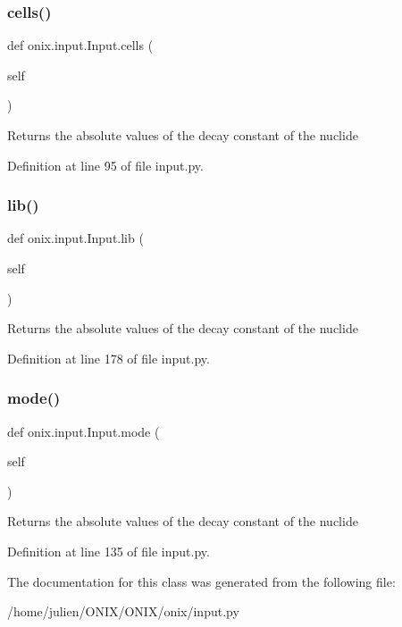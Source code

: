 \subsubsection{\texorpdfstring{cells()}{cells()}}
{\footnotesize\ttfamily def onix.\+input.\+Input.\+cells (\begin{DoxyParamCaption}\item[{}]{self }\end{DoxyParamCaption})}

\begin{DoxyVerb}Returns the absolute values of the decay constant of the nuclide\end{DoxyVerb}
 

Definition at line 95 of file input.\+py.

\mbox{\label{classonix_1_1input_1_1Input_aa9d1933ce8f2ec096ea158005527ad5b}} 
\subsubsection{\texorpdfstring{lib()}{lib()}}
{\footnotesize\ttfamily def onix.\+input.\+Input.\+lib (\begin{DoxyParamCaption}\item[{}]{self }\end{DoxyParamCaption})}

\begin{DoxyVerb}Returns the absolute values of the decay constant of the nuclide\end{DoxyVerb}
 

Definition at line 178 of file input.\+py.

\mbox{\label{classonix_1_1input_1_1Input_a6060c4ee684525bc73d4fbc15287f96a}} 
\subsubsection{\texorpdfstring{mode()}{mode()}}
{\footnotesize\ttfamily def onix.\+input.\+Input.\+mode (\begin{DoxyParamCaption}\item[{}]{self }\end{DoxyParamCaption})}

\begin{DoxyVerb}Returns the absolute values of the decay constant of the nuclide\end{DoxyVerb}
 

Definition at line 135 of file input.\+py.



The documentation for this class was generated from the following file\+:\begin{DoxyCompactItemize}
\item 
/home/julien/\+O\+N\+I\+X/\+O\+N\+I\+X/onix/input.\+py\end{DoxyCompactItemize}
